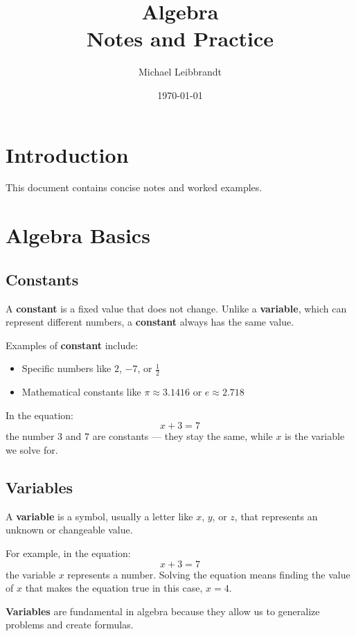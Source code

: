 \documentclass[11pt]{article}
\title{\Huge \textbf{Algebra}\\\large Notes and Practice}
\author{Michael Leibbrandt}
\date{\today}
\begin{document}
\maketitle
\tableofcontents
\newpage

\section{Introduction}

This document contains concise notes and worked examples.

\section{Algebra Basics}

\subsection{Constants}

A \textbf{constant} is a fixed value that does not change. Unlike a \textbf{variable}, which can represent different numbers, a \textbf{constant} always has the same value.

Examples of \textbf{constant} include:

\begin{itemize}
  \item Specific numbers like \( 2 \), \( -7 \), or \( \frac{1}{2} \)
  \item Mathematical constants like \( \pi \approx 3.1416 \) or \( e \approx 2.718 \)
\end{itemize}

In the equation:
\[
x + 3 = 7
\]
the number \( 3 \) and \( 7 \) are constants — they stay the same, while \( x \) is the variable we solve for.

\subsection{Variables}

A \textbf{variable} is a symbol, usually a letter like \( x \), \( y \), or \( z \), that represents an unknown or changeable value.

For example, in the equation:
\[
x + 3 = 7
\]
the variable \( x \) represents a number. Solving the equation means finding the value of \( x \) that makes the equation true in this case, \( x = 4 \).

\textbf{Variables} are fundamental in algebra because they allow us to generalize problems and create formulas.
\end{document}
